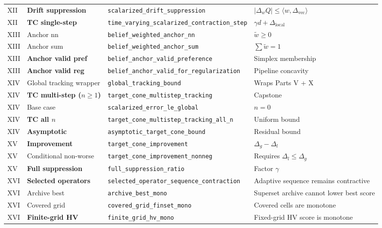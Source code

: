 \begin{longtable}{@{}p{}p{}p{}p{}@{}}
\midrule
XII & \textbf{Drift suppression} & \texttt{scalarized\_drift\_suppression} & $|\Delta_w Q| \le \langle w, \Delta_{\mathrm{vec}} \rangle$ \\
XII & \textbf{TC single-step} & \texttt{time\_varying\_scalarized\_contraction\_step} & $\gamma d + \Delta_{\mathrm{local}}$ \\
\midrule
XIII & Anchor nn & \texttt{belief\_weighted\_anchor\_nn} & $\tilde{w} \ge 0$ \\
XIII & Anchor sum & \texttt{belief\_weighted\_anchor\_sum} & $\sum \tilde{w} = 1$ \\
XIII & \textbf{Anchor valid pref} & \texttt{belief\_anchor\_valid\_preference} & Simplex membership \\
XIII & \textbf{Anchor valid reg} & \texttt{belief\_anchor\_valid\_for\_regularization} & Pipeline concavity \\
\midrule
XIV & Global tracking wrapper & \texttt{global\_tracking\_bound} & Wraps Parts V + X \\
XIV & \textbf{TC multi-step ($n \ge 1$)} & \texttt{target\_cone\_multistep\_tracking} & Capstone \\
XIV & Base case & \texttt{scalarized\_error\_le\_global} & $n = 0$ \\
XIV & \textbf{TC all $n$} & \texttt{target\_cone\_multistep\_tracking\_all\_n} & Uniform bound \\
XIV & \textbf{Asymptotic} & \texttt{asymptotic\_target\_cone\_bound} & Residual bound \\
\midrule
XV & \textbf{Improvement} & \texttt{target\_cone\_improvement} & $\Delta_g - \Delta_l$ \\
XV & Conditional non-worse & \texttt{target\_cone\_improvement\_nonneg} & Requires $\Delta_l\le\Delta_g$ \\
XV & \textbf{Full suppression} & \texttt{full\_suppression\_ratio} & Factor $\gamma$ \\
\midrule
XVI & \textbf{Selected operators} & \texttt{selected\_operator\_sequence\_contraction} & Adaptive sequence remains contractive \\
XVI & Archive best & \texttt{archive\_best\_mono} & Superset archive cannot lower best score \\
XVI & Covered grid & \texttt{covered\_grid\_finset\_mono} & Covered cells are monotone \\
XVI & \textbf{Finite-grid HV} & \texttt{finite\_grid\_hv\_mono} & Fixed-grid HV score is monotone \\
\end{longtable}
\endgroup


